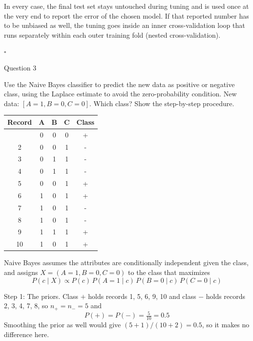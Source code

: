 \documentclass[12pt,letterpaper, onecolumn]{exam}
\begin{document}
\begin{questions}
\begin{solution}
        In every case, the final test set stays untouched during tuning and is used once at the very end to report the error of the chosen model. If that reported number has to be unbiased as well, the tuning goes inside an inner cross-validation loop that runs separately within each outer training fold (nested cross-validation).

        $\square$
    \end{solution}

    \newpage
    \question[20] Question 3\droppoints

    Use the Naive Bayes classifier to predict the new data as positive or negative class, using the Laplace estimate to avoid the zero-probability condition. New data: $[A=1, B=0, C=0]$. Which class? Show the step-by-step procedure.

    {\small
    \begin{longtable}{|c|c|c|c|c|}
        \hline Record & A & B & C & Class \\ \hline
        \endhead
        \hline
        \endfoot
        1 & 0 & 0 & 0 & + \\
        2 & 0 & 0 & 1 & - \\
        3 & 0 & 1 & 1 & - \\
        4 & 0 & 1 & 1 & - \\
        5 & 0 & 0 & 1 & + \\
        6 & 1 & 0 & 1 & + \\
        7 & 1 & 0 & 1 & - \\
        8 & 1 & 0 & 1 & - \\
        9 & 1 & 1 & 1 & + \\
        10 & 1 & 0 & 1 & +
    \end{longtable}
    }

    \begin{solution}

        Naive Bayes assumes the attributes are conditionally independent given the class, and assigns $X=(A=1,B=0,C=0)$ to the class that maximizes
        \begin{equation*}
            P(c\mid X) \propto P(c)\,P(A=1\mid c)\,P(B=0\mid c)\,P(C=0\mid c)
        \end{equation*}

        Step 1: The priors. Class $+$ holds records 1, 5, 6, 9, 10 and class $-$ holds records 2, 3, 4, 7, 8, so $n_+ = n_- = 5$ and
        \begin{equation*}
            P(+) = P(-) = \tfrac{5}{10} = 0.5
        \end{equation*}
        Smoothing the prior as well would give $(5+1)/(10+2) = 0.5$, so it makes no difference here.


\end{solution}
\end{questions}
\end{document}
